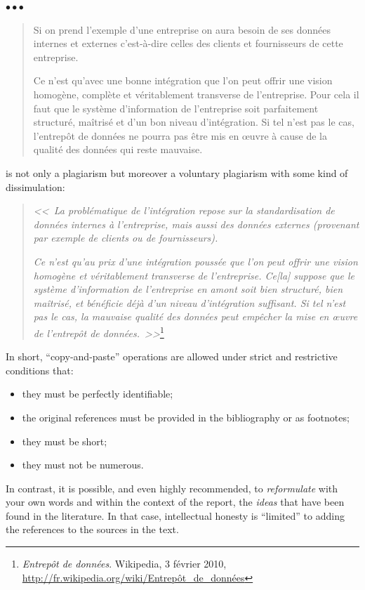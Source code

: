 \documentclass[11pt, english, screen, research-development]{report-rd-info}
\newenvironment{explanation}
{\color{blue}
 \begin{list}{}{\hspace{0.2\textwidth}\color{blue}}\item $\bullet\bullet\bullet$
}
{\end{list}}
\begin{document}
\begin{explanation}
\begin{quote}
   Si on prend l'exemple d'une entreprise on aura besoin de ses données internes et externes c'est-à-dire celles des clients et fournisseurs de cette entreprise.

   Ce n'est qu'avec une bonne intégration que l'on peut offrir une vision homogène, complète et véritablement transverse de l'entreprise.
   Pour cela il faut que le système d'information de l'entreprise soit parfaitement structuré, maîtrisé et d'un bon niveau d'intégration.
   Si tel n'est pas le cas, l'entrepôt de données ne pourra pas être mis en \oe uvre à cause de la qualité des données qui reste mauvaise.
   \end{quote}
   is not only a plagiarism but moreover a voluntary plagiarism with some kind of dissimulation:
   \begin{quote}
      \emph{<<~La problématique de l'intégration repose sur la standardisation de données internes à l'entreprise, mais aussi des données externes (provenant par exemple de clients ou de fournisseurs).}

      \emph{Ce n'est qu'au prix d'une intégration poussée que l'on peut offrir une vision homogène et véritablement transverse de l'entreprise.
         Ce[la] suppose que le système d'information de l'entreprise en amont soit bien structuré, bien maîtrisé, et bénéficie déjà d'un niveau d'intégration suffisant.
         Si tel n'est pas le cas, la mauvaise qualité des données peut empêcher la mise en \oe uvre de l'entrepôt de données.~>>}\footnote{\emph{Entrepôt de données}. Wikipedia, 3 février 2010, \url{http://fr.wikipedia.org/wiki/Entrepôt_de_données}}
   \end{quote}

   \vspace{2\baselineskip}

   In short, ``copy-and-paste'' operations are allowed under strict and restrictive conditions that:
   \begin{itemize}
      \item they must be perfectly identifiable;
      \item the original references must be provided in the bibliography or as footnotes;
      \item they must be short;
      \item they must not be numerous.
   \end{itemize}

   In contrast, it is possible, and even highly recommended, to \emph{reformulate} with your own words and within the context of the report, the \emph{ideas} that have been found in the literature.
    In that case, intellectual honesty is ``limited'' to adding the references to the sources in the text.


\end{explanation}
\end{document}
